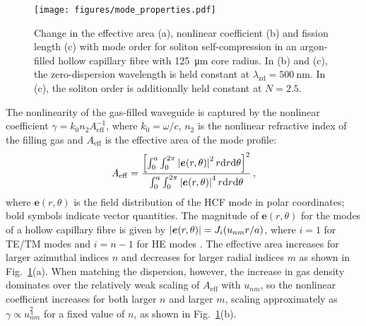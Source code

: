 \documentclass[amsmath, preprint, floatfix]{revtex4-2}
\begin{document}
\begin{figure}
    \centering
    \texttt{[image: figures/mode\_properties.pdf]}
    \caption{Change in the effective area (a), nonlinear coefficient (b) and fission length (c) with mode order for soliton self-compression in an argon-filled hollow capillary fibre with \SI{125}{\micro\meter} core radius. In (b) and (c), the zero-dispersion wavelength is held constant at $\lambda_\mathrm{zd} = \SI{500}{\nm}$. In (c), the soliton order is additionally held constant at $N=2.5$.}
    \label{fig:mode_properties}
\end{figure}
The nonlinearity of the gas-filled waveguide is captured by the nonlinear coefficient $\gamma = k_0 n_2 A_\mathrm{eff}^{-1}$, where $k_0=\omega/c$, $n_2$ is the nonlinear refractive index of the filling gas and $A_\mathrm{eff}$ is the effective area of the mode profile:
\begin{equation}
    A_\mathrm{eff} = \frac{
        \qty[
            \int_0^a \int_0^{2\pi} \abs{\bm{e}(r, \theta)}^2 \,r\dd r \dd \theta
        ]^2
    }
    {
        \int_0^a \int_0^{2\pi} \abs{\bm{e}(r, \theta)}^4 \,r\dd r \dd \theta
    }\,,
\end{equation}
where $\bm{e}(r, \theta)$ is the field distribution of the HCF mode in polar coordinates; bold symbols indicate vector quantities. The magnitude of $\bm{e}(r, \theta)$ for the modes of a hollow capillary fibre is given by $\abs{\bm{e}(r, \theta)} = J_i\qty(u_{nm}r/a)$, where $i = 1$ for TE/TM modes and $i=n-1$ for HE modes \cite{marcatili_hollow_1964}. The effective area increases for larger azimuthal indices $n$ and decreases for larger radial indices $m$ as shown in Fig.~\ref{fig:mode_properties}(a). When matching the dispersion, however, the increase in gas density dominates over the relatively weak scaling of $A_\mathrm{eff}$ with $u_{nm}$, so the nonlinear coefficient increases for both larger $n$ and larger $m$, scaling approximately as $\gamma \propto u_{nm}^{\frac{9}{4}}$ for a fixed value of $n$, as shown in Fig.~\ref{fig:mode_properties}(b).
\end{document}
